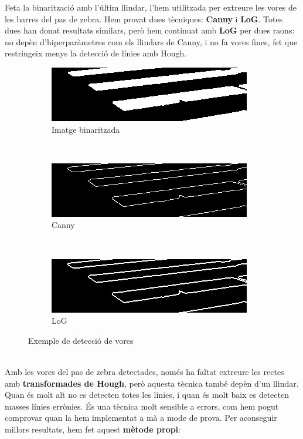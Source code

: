 \documentclass[10pt,a4paper,twocolumn,twoside]{article}
\begin{document}
Feta la binarització amb l’últim llindar, l’hem utilitzada per extreure les vores de les barres del pas de zebra. Hem provat dues tècniques: \textbf{Canny} i \textbf{LoG}. Totes dues han donat resultats similars, però hem continuat amb \textbf{LoG} per dues raons: no depèn d’hiperparàmetres com els llindars de Canny, i no fa vores fines, fet que restringeix menys la detecció de línies amb Hough.
\begin{figure}[h]
	\centering
	\begin{subfigure}{0.31\columnwidth}
		\includegraphics[width=\linewidth]{figs/mog}
		\caption{Imatge binaritzada}
	\end{subfigure}
	\ 
	\begin{subfigure}{0.31\columnwidth}
		\includegraphics[width=\linewidth]{figs/canny}
		\caption{Canny}
	\end{subfigure}
	\ 
	\begin{subfigure}{0.31\columnwidth}
		\includegraphics[width=\linewidth]{figs/log}
		\caption{LoG}
	\end{subfigure}
	\caption{Exemple de detecció de vores}
	\label{fig:hough}
\end{figure}
\\
Amb les vores del pas de zebra detectades, només ha faltat extreure les rectes amb \textbf{transformades de Hough}, però aquesta tècnica també depèn d'un llindar. Quan és molt alt no es detecten totes les línies, i quan és molt baix es detecten masses línies errònies. És una tècnica molt sensible a errors, com hem pogut comprovar quan la hem implementat a mà a mode de prova. Per aconseguir millors resultats, hem fet aquest \textbf{mètode propi}:
\end{document}
